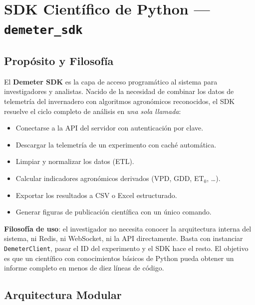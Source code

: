 \chapter{SDK Científico de Python — \texttt{demeter\_sdk}}
\label{sec:sdk}

\section{Propósito y Filosofía}

El \textbf{Demeter SDK} es la capa de acceso programático al sistema para investigadores y
analistas. Nacido de la necesidad de combinar los datos de telemetría del invernadero con
algoritmos agronómicos reconocidos, el SDK resuelve el ciclo completo de análisis en
\textit{una sola llamada}:

\begin{itemize}[leftmargin=*, label=--]
    \item Conectarse a la API del servidor con autenticación por clave.
    \item Descargar la telemetría de un experimento con caché automática.
    \item Limpiar y normalizar los datos (ETL).
    \item Calcular indicadores agronómicos derivados (VPD, GDD, ET$_0$, …).
    \item Exportar los resultados a CSV o Excel estructurado.
    \item Generar figuras de publicación científica con un único comando.
\end{itemize}

\begin{designnote}
\textbf{Filosofía de uso}: el investigador no necesita conocer la arquitectura interna del
sistema, ni Redis, ni WebSocket, ni la API directamente. Basta con instanciar
\texttt{DemeterClient}, pasar el ID del experimento y el SDK hace el resto.
El objetivo es que un científico con conocimientos básicos de Python pueda obtener
un informe completo en menos de diez líneas de código.
\end{designnote}

\section{Arquitectura Modular}

